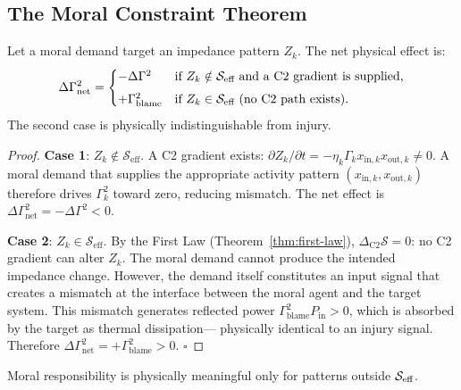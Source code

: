 \documentclass[aps,pre,twocolumn,superscriptaddress,floatfix]{revtex4-2}
\begin{document}
\subsection{The Moral Constraint Theorem}
\label{sec:moral-constraint}

\begin{theorem}
\label{thm:moral-constraint}
Let a moral demand target an impedance pattern $Z_k$.
The net physical effect is:
\begin{equation}
  \Delta\Gamma^2_{\textnormal{net}} =
  \begin{cases}
    -\Delta\Gamma^2 & \text{if } Z_k \notin
      \mathcal{S}_{\textnormal{eff}}
      \text{ and a C2 gradient is supplied,} \\[4pt]
    +\Gamma^2_{\textnormal{blame}} & \text{if } Z_k \in
      \mathcal{S}_{\textnormal{eff}}
      \text{ (no C2 path exists).}
  \end{cases}
  \label{eq:moral-constraint}
\end{equation}
The second case is physically indistinguishable from injury.
\end{theorem}

\begin{proof}
\textbf{Case 1}: $Z_k \notin \mathcal{S}_{\text{eff}}$.
A C2 gradient exists: $\partial Z_k/\partial t =
-\eta_k \Gamma_k x_{\text{in},k} x_{\text{out},k}
\neq 0$.
A moral demand that supplies the appropriate activity
pattern $(x_{\text{in},k}, x_{\text{out},k})$
therefore drives $\Gamma_k^2$ toward zero, reducing
mismatch. The net effect is $\Delta\Gamma^2_{\text{net}}
= -\Delta\Gamma^2 < 0$.

\textbf{Case 2}: $Z_k \in \mathcal{S}_{\text{eff}}$.
By the First Law (Theorem~\ref{thm:first-law}),
$\Delta_{\text{C2}}\mathcal{S} = 0$: no C2 gradient
can alter $Z_k$.
The moral demand cannot produce the intended
impedance change.
However, the demand itself constitutes an
input signal that creates a mismatch at the
interface between the moral agent and the
target system.
This mismatch generates reflected power
$\Gamma^2_{\text{blame}} P_{\text{in}} > 0$, which
is absorbed by the target as thermal dissipation---
physically identical to an injury signal.
Therefore $\Delta\Gamma^2_{\text{net}} =
+\Gamma^2_{\text{blame}} > 0$. $\square$
\end{proof}

\begin{corollary}
\label{cor:moral-boundary}
Moral responsibility is physically meaningful only for
patterns outside $\mathcal{S}_{\textnormal{eff}}$.
\end{corollary}
\end{document}
